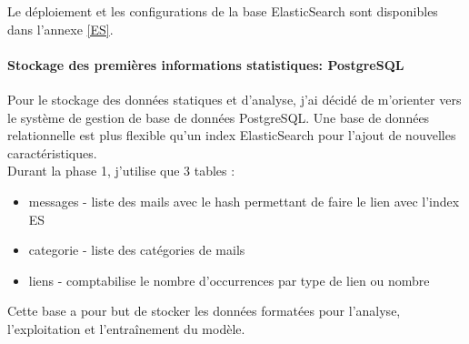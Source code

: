 \documentclass[a4paper,12pt]{article}
\begin{document}
				Le déploiement et les configurations de la base ElasticSearch sont disponibles dans l'annexe \ref{ES}.
				
				
			\paragraph{Stockage des premières informations statistiques: PostgreSQL} Pour le stockage des données statiques et d'analyse, j'ai décidé de m'orienter vers le système de gestion de base de données PostgreSQL. Une base de données relationnelle est plus flexible qu'un index ElasticSearch pour l'ajout de nouvelles caractéristiques. \\
			
				Durant la phase 1, j'utilise que 3 tables :
				\begin{itemize}
					\item messages - liste des mails avec le hash permettant de faire le lien avec l'index ES
					\item categorie - liste des catégories de mails
					\item liens - comptabilise le nombre d'occurrences par type de lien ou nombre
				\end{itemize}
				
				Cette base a pour but de stocker les données formatées pour l'analyse, l'exploitation et l’entraînement du modèle.
			
\end{document}
